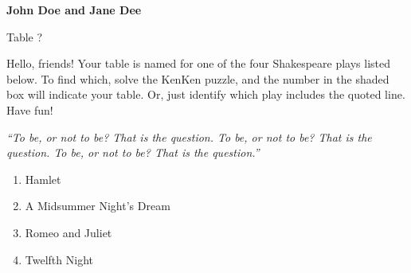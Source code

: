 \documentclass{article}
\newcounter{row}
\newcounter{col}
\edef\puzzlescale{1.2}
\edef\numrows{4}
\newcommand\setrow[\numrows]{
  \setcounter{col}{1}
  \foreach \n in {#1, #2, #3, #4} {
    \edef\x{\value{col} - 1}
    \edef\y{1 + \numrows - \value{row}}
    \node[anchor=north west,scale=0.75*\puzzlescale] at (\x, \y) {\n};
    \stepcounter{col}
  }
  \stepcounter{row}
}
\newcommand\boldh[3]{
  \edef\y{\numrows-#1}
  \edef\x{#2}
  \edef\z{\x + #3}
  \draw[very thick] (\x, \y) -- (\z, \y);
}
\newcommand\boldv[3]{
  \edef\y{\numrows-#1}
  \edef\x{#2}
  \edef\z{\y - #3}
  \draw[ultra thick] (\x, \y) -- (\x, \z);
}
\newcommand\shadebox[2]{
  \edef\y{\numrows-#1}
  \edef\x{#2}
  \fill[shadegray] (\x, \y) rectangle (\x+1,\y-1);
}
\begin{document}
\begin{center}
  \Large \textbf{John Doe and Jane Dee}

  Table ?
\end{center}

Hello, friends! 
Your table is named for one of the four Shakespeare plays listed
below.  To find which, solve the KenKen puzzle, and the number in the
shaded box will indicate your table.  Or, just identify which
play includes the quoted line.  Have fun!

\medskip

\begin{minipage}[center]{0.58\textwidth}

  \bigskip
  
  \parbox{0.85\textwidth}{
    \it
  \noindent
    ``To be, or not to be?  That is the question.
    \phantom{``}To be, or not to be?  That is the question.
    \phantom{``}To be, or not to be?  That is the question.''
  }

  \begin{enumerate}
    \setlength{\itemsep}{1pt}
  \item Hamlet
  \item A Midsummer Night's Dream
  \item Romeo and Juliet
  \item Twelfth Night
  \end{enumerate}
\end{minipage}
%
\begin{minipage}[center]{0.38\textwidth}
\end{minipage}
%
\end{document}
